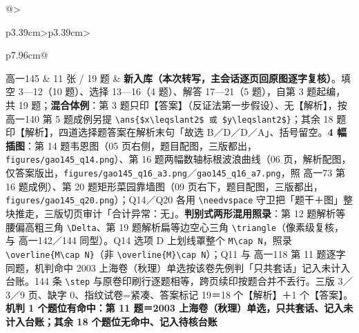 \documentclass[a4paper,11pt]{article}
\begin{document}
\begin{xltabular}{\textwidth}{@{}>{\raggedright\arraybackslash}p{3.39cm}>{\centering\arraybackslash}p{3.39cm}>{\raggedright\arraybackslash}p{7.96cm}@{}}
高一145 & 11 张 / 19 题 & \textbf{新入库（本次转写，主会话逐页回原图逐字复核）}。填空 3---12（10 题）、选择 13---16（4 题）、解答 17---21（5 题），自第 3 题起编，共 19 题；\textbf{混合体例}：第 3 题只印【答案】（反证法第一步假设）、无【解析】，按 高一140 第 5 题成例另提 \texttt{\textbackslash{}ans\{\$x\textbackslash{}leqslant2\$\ 或\ \$y\textbackslash{}leqslant2\$\}}；其余 18 题印【解析】，四道选择题答案在解析末句「故选 B／D／D／A」、括号留空。\textbf{4 幅插图}：第 14 题韦恩图（05 页右侧，题目配图，三版都出，\texttt{figures/\allowbreak{}gao145\_q14.png}）、第 16 题两幅数轴标根波浪曲线（06 页，解析配图，仅答案版出，\texttt{figures/\allowbreak{}gao145\_q16\_a3.png}／\texttt{gao145\_q16\_a7.png}，照 高一73 第 16 题成例）、第 20 题矩形菜园靠墙图（09 页右下，题目配图，三版都出，\texttt{figures/\allowbreak{}gao145\_q20.png}）；Q14／Q20 各用 \texttt{\textbackslash{}needvspace} 守卫把「题干＋图」整块推走，三版切页审计「合计异常：无」。\textbf{判别式两形混用照录}：第 12 题解析等腰偏高粗三角 \texttt{\textbackslash{}Delta}、第 19 题解析扁等边空心三角 \texttt{\textbackslash{}triangle}（像素级复核，与 高一142／144 同型）。Q14 选项 D 上划线罩整个 \texttt{M\textbackslash{}cap\ N}，照录 \texttt{\textbackslash{}overline\{M\textbackslash{}cap\ N\}}（非 \texttt{\textbackslash{}overline\{M\}\textbackslash{}cap\ N}）；Q11 与 高一118 第 11 题逐字同题，机判命中 2003 上海卷（秋理）单选按该卷先例判「只共套话」记入未计入台账。144 条 \texttt{\textbackslash{}step} 与原卷印刷行逐题相等，跨页续印按题合并不丢行。三版 3／3／9 页、缺字 0、指纹试卷=紧凑、答案标记 19＝18 个【解析】＋1 个【答案】。\textbf{机判 1 个题位有命中：第 11 题＝2003 上海卷（秋理）单选，只共套话、记入未计入台账；其余 18 个题位无命中、记入待核台账} \\ \addlinespace[1pt]

\end{xltabular}
\end{document}
